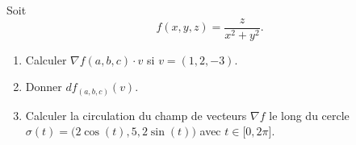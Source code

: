 
\begin{exercice}\label{exoOutilsMath-0090}

    Soit 
    \begin{equation}
        f(x,y,z)=\frac{ z }{ x^2+y^2 }.
    \end{equation}
    \begin{enumerate}
        \item
            Calculer $\nabla f(a,b,c)\cdot v$ si $v=(1,2,-3)$.
        \item
            Donner $df_{(a,b,c)}(v)$.
        \item
            Calculer la circulation du champ de vecteurs $\nabla f$ le long du cercle $\sigma(t)=\big(2\cos(t),5,2\sin(t)\big)$ avec $t\in\mathopen[ 0 , 2\pi \mathclose]$.
            
    \end{enumerate}

\end{exercice}
